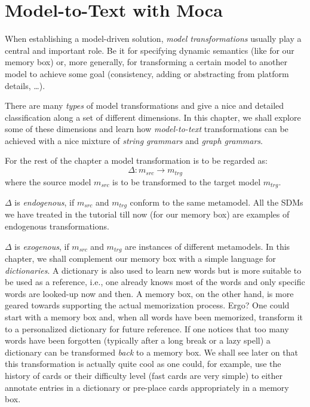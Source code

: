 \chapter{Model-to-Text with Moca}

When establishing a model-driven solution, \emph{model transformations} usually play a central and important role.
Be it for specifying dynamic semantics (like for our memory box) or, more generally, for transforming a certain model to another model to achieve some goal (consistency, adding or abstracting from platform details, \ldots).  

There are many \emph{types} of model transformations and \cite{CH03,Mens_Gorp_2006} give a nice and detailed classification along a set of different dimensions. 
In this chapter, we shall explore some of these dimensions and learn how \emph{model-to-text} transformations can be achieved with a nice mixture of \emph{string grammars} and \emph{graph grammars}. 

For the rest of the chapter a model transformation is to be regarded as:
\begin{displaymath}
 	\Delta: m_{src} \rightarrow m_{trg}
\end{displaymath}
where the source model $m_{src}$ is to be transformed to the target model $m_{trg}$.

$\Delta$ is \emph{endogenous}, if $m_{src}$ and $m_{trg}$ conform to the same metamodel.
All the SDMs we have treated in the tutorial till now (for our memory box) are examples of endogenous transformations.

$\Delta$ is \emph{exogenous}, if $m_{src}$ and $m_{trg}$ are instances of different metamodels.
In this chapter, we shall complement our memory box with a simple language for \emph{dictionaries}.
A dictionary is also used to learn new words but is more suitable to be used as a reference, i.e., one already knows most of the words and only specific words are looked-up now and then.
A memory box, on the other hand, is more geared towards supporting the actual memorization process.
Ergo?  One could start with a memory box and, when all words have been memorized, transform it to a personalized dictionary for future reference.
If one notices that too many words have been forgotten (typically after a long break or a lazy spell) a dictionary can be transformed \emph{back} to a memory box.
We shall see later on that this transformation is actually quite cool as one could, for example, use the history of cards or their difficulty level (fast cards are very simple) to either annotate entries in a dictionary or pre-place cards appropriately in a memory box. 

